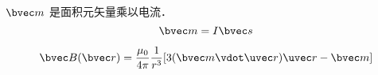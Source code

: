
\begin{issues}
\issueDraft
\end{issues}

$\bvec m$ 是面积元矢量乘以电流．
\begin{equation}
\bvec m = I \bvec s
\end{equation}

\begin{equation}
\bvec B(\bvec r) = \frac{\mu_0}{4\pi} \frac{1}{r^3} [3(\bvec m \vdot \uvec r) \uvec r - \bvec m]
\end{equation}
